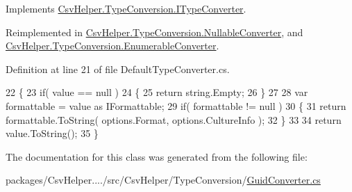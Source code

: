 Implements \hyperlink{a00117_a90c465c63dbcf913f38aa878f35e77c7}{Csv\-Helper.\-Type\-Conversion.\-I\-Type\-Converter}.



Reimplemented in \hyperlink{a00136_a7205cdb61d2d119582958232b3e63109}{Csv\-Helper.\-Type\-Conversion.\-Nullable\-Converter}, and \hyperlink{a00093_a7e07e9532857d748654d37db590a0e11}{Csv\-Helper.\-Type\-Conversion.\-Enumerable\-Converter}.



Definition at line 21 of file Default\-Type\-Converter.\-cs.


\begin{DoxyCode}
22         \{
23             \textcolor{keywordflow}{if}( value == null )
24             \{
25                 \textcolor{keywordflow}{return} string.Empty;
26             \}
27 
28             var formattable = value as IFormattable;
29             \textcolor{keywordflow}{if}( formattable != null )
30             \{
31                 \textcolor{keywordflow}{return} formattable.ToString( options.Format, options.CultureInfo );
32             \}
33 
34             \textcolor{keywordflow}{return} value.ToString();
35         \}
\end{DoxyCode}


The documentation for this class was generated from the following file\-:\begin{DoxyCompactItemize}
\item 
packages/\-Csv\-Helper..../src/\-Csv\-Helper/\-Type\-Conversion/\hyperlink{a00267}{Guid\-Converter.\-cs}\end{DoxyCompactItemize}

